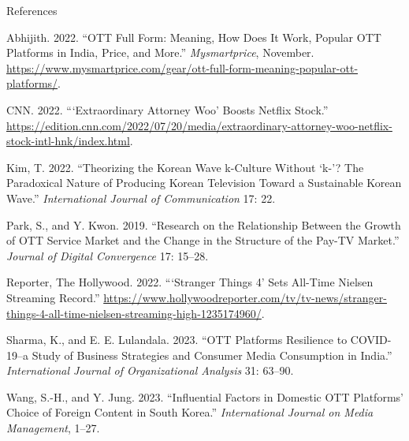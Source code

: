 \documentclass[
  ignorenonframetext,
]{beamer}
\newlength{\cslhangindent}
\newlength{\cslentryspacingunit} %
\newenvironment{CSLReferences}[2] %
 {%
  \setlength{\parindent}{0pt}
  \ifodd #1
  \let\oldpar\par
  \def\par{\hangindent=\cslhangindent\oldpar}
  \fi
  \setlength{\parskip}{#2\cslentryspacingunit}
 }%
 {}
\begin{document}
\begin{frame}{References}
\protect\hypertarget{references}{}
\hypertarget{refs}{}
\begin{CSLReferences}{1}{0}
\leavevmode{}%
Abhijith. 2022. {``OTT Full Form: Meaning, How Does It Work, Popular OTT
Platforms in India, Price, and More.''} \emph{Mysmartprice}, November.
\url{https://www.mysmartprice.com/gear/ott-full-form-meaning-popular-ott-platforms/}.

\leavevmode{}%
CNN. 2022. {``{`Extraordinary Attorney Woo'} Boosts Netflix Stock.''}
\url{https://edition.cnn.com/2022/07/20/media/extraordinary-attorney-woo-netflix-stock-intl-hnk/index.html}.

\leavevmode{}%
Kim, T. 2022. {``Theorizing the Korean Wave\textbar{} k-Culture Without
{`k-'}? The Paradoxical Nature of Producing Korean Television Toward a
Sustainable Korean Wave.''} \emph{International Journal of
Communication} 17: 22.

\leavevmode{}%
Park, S., and Y. Kwon. 2019. {``Research on the Relationship Between the
Growth of OTT Service Market and the Change in the Structure of the
Pay-TV Market.''} \emph{Journal of Digital Convergence} 17: 15--28.

\leavevmode{}%
Reporter, The Hollywood. 2022. {``{`Stranger Things 4'} Sets All-Time
Nielsen Streaming Record.''}
\url{https://www.hollywoodreporter.com/tv/tv-news/stranger-things-4-all-time-nielsen-streaming-high-1235174960/}.

\leavevmode{}%
Sharma, K., and E. E. Lulandala. 2023. {``OTT Platforms Resilience to
COVID-19--a Study of Business Strategies and Consumer Media Consumption
in India.''} \emph{International Journal of Organizational Analysis} 31:
63--90.

\leavevmode{}%
Wang, S.-H., and Y. Jung. 2023. {``Influential Factors in Domestic OTT
Platforms' Choice of Foreign Content in South Korea.''}
\emph{International Journal on Media Management}, 1--27.

\end{CSLReferences}
\end{frame}
\end{document}

